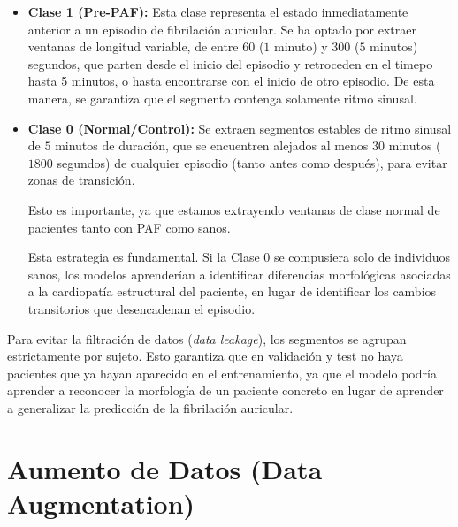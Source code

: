 \begin{itemize}
  \item \textbf{Clase 1 (Pre-PAF):}
  Esta clase representa el estado inmediatamente anterior a un episodio de fibrilación auricular. Se ha optado por extraer
  ventanas de longitud variable, de entre $60$ ($1$ minuto) y $300$ ($5$ minutos) segundos, que parten desde el inicio del episodio
  y retroceden en el timepo hasta 5 minutos, o hasta encontrarse con el inicio de otro episodio. De esta manera, se garantiza
  que el segmento contenga solamente ritmo sinusal.

  \item \textbf{Clase 0 (Normal/Control):}
  Se extraen segmentos estables de ritmo sinusal
  de $5$ minutos de duración, que se encuentren alejados al menos $30$ minutos
  ($1800$ segundos) de cualquier episodio
  (tanto antes como después), para evitar zonas de transición.

  Esto es importante, ya que estamos extrayendo ventanas de clase normal de pacientes 
  tanto con PAF como sanos.

  Esta estrategia es fundamental.
  Si la Clase 0 se compusiera solo de individuos sanos, los modelos aprenderían a identificar
  diferencias morfológicas asociadas a la cardiopatía estructural del paciente, en lugar de identificar
  los cambios transitorios que desencadenan el episodio.

\end{itemize}

Para evitar la filtración de datos (\textit{data leakage}), los segmentos se agrupan estrictamente por sujeto.
Esto garantiza que en validación y test no haya pacientes que ya hayan aparecido en
el entrenamiento, ya que el modelo podría aprender a reconocer la morfología de un paciente concreto en lugar de
aprender a generalizar la predicción de la fibrilación auricular.


\section{Aumento de Datos (Data Augmentation)}
\label{sec:aumentacion}

